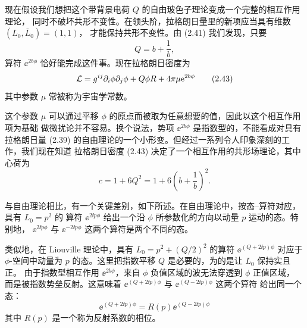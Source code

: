 现在假设我们想把这个带背景电荷 $Q$ 的自由玻色子理论变成一个完整的相互作用理论，
同时不破坏共形不变性。在领头阶，拉格朗日量里的新项应当具有维数 $(L_0,\bar L_0)=(1,1)$，
才能保持共形不变性。由 (2.41) 我们发现，只要
\begin{equation}
  Q = b + \frac{1}{b},
  \tag{2.42}
\end{equation}
算符 $\ee^{2b\phi}$ 恰好能完成这件事。现在拉格朗日密度为
\begin{equation}
  \mathcal{L} = g^{ij}\partial_i\phi\partial_j\phi + Q\phi R + 4\pi\mu\mathrm{e}^{2b\phi}
  \tag{2.43}
\end{equation}
其中参数 $\mu$ 常被称为宇宙学常数。


这个参数 $\mu$ 可以通过平移 $\phi$ 的原点而被取为任意想要的值，因此以这个相互作用项为基础
做微扰论并不容易。换个说法，势项 $\ee^{2b\phi}$ 是指数型的，不能看成对具有拉格朗日量 (2.39)
的自由理论的一个小形变。但经过一系列令人印象深刻的工作，我们现在知道
拉格朗日密度 (2.43) 决定了一个相互作用的共形场理论，其中心荷为
\begin{equation}
  c = 1 + 6Q^2 = 1 + 6\left(b+\frac{1}{b}\right)^2.
  \tag{2.44}
\end{equation}


与自由理论相比，有一个关键差别，如下所述。在自由理论中，按态–算符对应，具有 $L_0=p^2$ 的
算符 $\ee^{2\ii p\phi}$ 给出一个沿 $\phi$ 所参数化的方向以动量 $p$ 运动的态。特别地，
$\ee^{2\ii p\phi}$ 与 $\ee^{-2\ii p\phi}$ 这两个算符是两个不同的态。

类似地，在 Liouville 理论中，具有 $L_0=p^2+(Q/2)^2$ 的算符 $\ee^{(Q+2\ii p)\phi}$ 对应于
$\phi$-空间中动量为 $p$ 的态。这里把指数平移 $Q$ 是必要的，为的是让 $L_0$ 保持实且正。
由于指数型相互作用 $\ee^{2b\phi}$，来自 $\phi$ 负值区域的波无法穿透到 $\phi$ 正值区域，
而是被指数势垒反射。这意味着 $\ee^{(Q+2\ii p)\phi}$ 与 $\ee^{(Q-2\ii p)\phi}$ 这两个算符
给出同一个态：
\begin{equation}
  \ee^{(Q+2\ii p)\phi} = R(p)\ee^{(Q-2\ii p)\phi}
  \tag{2.45}
\end{equation}
其中 $R(p)$ 是一个称为反射系数的相位。

